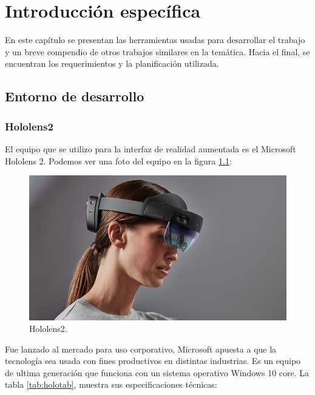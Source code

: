 \chapter{Introducción específica} %

\label{Chapter2}

En este capítulo se presentan las herramientas usadas para desarrollar el trabajo y un breve compendio de otros trabajos similares en la temática. Hacia el final, se encuentran los requerimientos y la planificación utilizada.

\section{Entorno de desarrollo}
\subsection{Hololens2}

El equipo que se utilizo para la interfaz de realidad aumentada es el Microsoft Hololens 2. Podemos ver una foto del equipo en la figura \ref{fig:hololens2}:

\begin{figure}[htpb]
	\centering
	\includegraphics[scale=.5]{./Figures/hololens2.jpeg}
	\caption{Hololens2\protect\footnotemark.}
	\label{fig:hololens2}
\end{figure}



Fue lanzado al mercado para uso corporativo, Microsoft apuesta a que la tecnología sea usada con fines productivos en distintas industrias. Es un equipo de ultima generación que funciona con un sistema operativo Windows 10 core.  La tabla \ref{tab:holotab}, muestra sus especificaciones técnicas:

